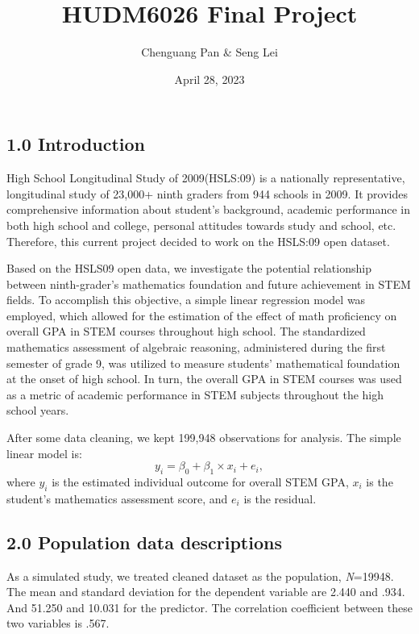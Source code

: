 \documentclass[
]{article}
\title{HUDM6026 Final Project}
\author{Chenguang Pan \& Seng Lei}
\date{April 28, 2023}
\begin{document}
\maketitle

\hypertarget{introduction}{%
\subsection{1.0 Introduction}\label{introduction}}

High School Longitudinal Study of 2009(HSLS:09) is a nationally
representative, longitudinal study of 23,000+ ninth graders from 944
schools in 2009. It provides comprehensive information about student's
background, academic performance in both high school and college,
personal attitudes towards study and school, etc. Therefore, this
current project decided to work on the HSLS:09 open dataset.

Based on the HSLS09 open data, we investigate the potential relationship
between ninth-grader's mathematics foundation and future achievement in
STEM fields. To accomplish this objective, a simple linear regression
model was employed, which allowed for the estimation of the effect of
math proficiency on overall GPA in STEM courses throughout high school.
The standardized mathematics assessment of algebraic reasoning,
administered during the first semester of grade 9, was utilized to
measure students' mathematical foundation at the onset of high school.
In turn, the overall GPA in STEM courses was used as a metric of
academic performance in STEM subjects throughout the high school years.

After some data cleaning, we kept 199,948 observations for analysis. The
simple linear model is: \[y_i = \beta_0 + \beta_1\times x_i + e_i ,\]
where \(y_i\) is the estimated individual outcome for overall STEM GPA,
\(x_i\) is the student's mathematics assessment score, and \(e_i\) is
the residual.

\hypertarget{population-data-descriptions}{%
\subsection{2.0 Population data
descriptions}\label{population-data-descriptions}}

As a simulated study, we treated cleaned dataset as the population,
\emph{N}=19948. The mean and standard deviation for the dependent
variable are 2.440 and .934. And 51.250 and 10.031 for the predictor.
The correlation coefficient between these two variables is .567.
\end{document}
